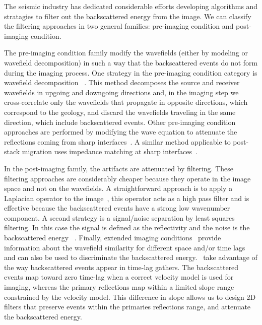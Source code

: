 The seismic industry has dedicated considerable efforts developing algorithms and stratagies
to filter out the backscattered energy from the image. We can classify the filtering
 approaches in two general families: pre-imaging condition and post-imaging condition. 

The pre-imaging condition family modify the wavefields (either by modeling or wavefield decomposition)
 in such a way that the backscattered events do not form during the imaging process.
One strategy in the pre-imaging condition category is wavefield decomposition
~\citep[]{liu:S29,fei:3130}. This method decomposes the source and receiver wavefields in upgoing
and downgoing directions and, in the imaging step we cross-correlate only the wavefields that propagate
in opposite directions, which correspond to the geology, and discard the wavefields traveling in the same direction,
 which include backscattered events. Other pre-imaging 
condition approaches are performed by modifying  the wave equation to attenuate the reflections coming from 
sharp interfaces~\citep{fletcher:2049}. A similar method applicable to post-stack migration 
uses impedance matching at sharp interfaces~\citep{baysal:132}. 

In the post-imaging family, the artifacts are attenuated by filtering. These filtering approaches
 are considerably cheaper because they operate in the image space and not on the wavefields. A straightforward
 approach is to apply a Laplacian operator to the image~\citep{youn:246}, this operator
 acts as a high pass filter and is effective because the backscattered events have a strong low wavenumber
component. A second strategy is a signal/noise  separation by least squares filtering. In
 this case the signal is defined as the reflectivity and the noise is the backscattered energy
~\citep{guitton:S19}. Finally, extended imaging conditions~\citep{sava:S209} provide information
 about the wavefield similarity for different space and/or time lags and can also be used to discriminate
the backscattered energy.~\cite{kaelin:3125} take advantage of the way backscattered events appear in 
time-lag gathers. The backscattered events map toward zero time-lag when a correct velocity model is used for imaging,
 whereas the primary reflections map within a limited slope range constrained by the velocity model. This difference in
 slope allows us to design 2D filters that preserve events within the primaries reflections range, and
attenuate the backscattered energy.


